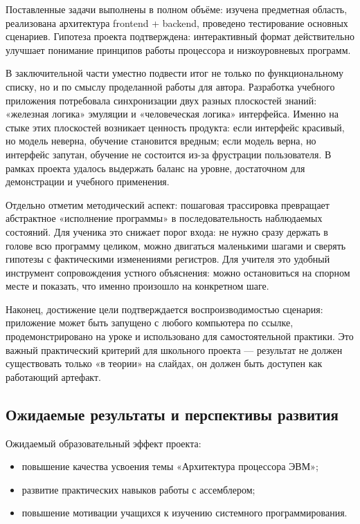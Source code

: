 \documentclass[12pt,a4paper]{article}
\begin{document}
Поставленные задачи выполнены в полном объёме: изучена предметная область, реализована архитектура frontend + backend, проведено тестирование основных сценариев. Гипотеза проекта подтверждена: интерактивный формат действительно улучшает понимание принципов работы процессора и низкоуровневых программ.

В заключительной части уместно подвести итог не только по функциональному списку, но и по смыслу проделанной работы для автора. Разработка учебного приложения потребовала синхронизации двух разных плоскостей знаний: «железная логика» эмуляции и «человеческая логика» интерфейса. Именно на стыке этих плоскостей возникает ценность продукта: если интерфейс красивый, но модель неверна, обучение становится вредным; если модель верна, но интерфейс запутан, обучение не состоится из-за фрустрации пользователя. В рамках проекта удалось выдержать баланс на уровне, достаточном для демонстрации и учебного применения.

Отдельно отметим методический аспект: пошаговая трассировка превращает абстрактное «исполнение программы» в последовательность наблюдаемых состояний. Для ученика это снижает порог входа: не нужно сразу держать в голове всю программу целиком, можно двигаться маленькими шагами и сверять гипотезы с фактическими изменениями регистров. Для учителя это удобный инструмент сопровождения устного объяснения: можно остановиться на спорном месте и показать, что именно произошло на конкретном шаге.

Наконец, достижение цели подтверждается воспроизводимостью сценария: приложение может быть запущено с любого компьютера по ссылке, продемонстрировано на уроке и использовано для самостоятельной практики. Это важный практический критерий для школьного проекта --- результат не должен существовать только «в теории» на слайдах, он должен быть доступен как работающий артефакт.

\subsection{Ожидаемые результаты и перспективы развития}
Ожидаемый образовательный эффект проекта:
\begin{itemize}
  \item повышение качества усвоения темы «Архитектура процессора ЭВМ»;
  \item развитие практических навыков работы с ассемблером;
  \item повышение мотивации учащихся к изучению системного программирования.
\end{itemize}
\end{document}
